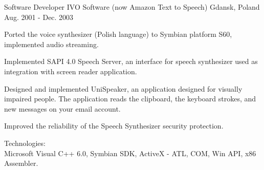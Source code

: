 \begin{cventries}
\cventry
{Software Developer} %
{IVO Software (now Amazon Text to Speech)} %
{Gdansk, Poland} %
{Aug. 2001 - Dec. 2003} %
{
  \begin{cvitems} %
    \item
    {
      Ported the voice synthesizer (Polish language) to Symbian platform S60, implemented audio streaming.
    }
    \item
    {
      Implemented SAPI 4.0 Speech Server, an interface for speech synthesizer used as integration with screen reader application.
    }
    \item
    {
      Designed and implemented UniSpeaker, an application designed for visually impaired people.
      The application reads the clipboard, the keyboard strokes, and new messages on your email account.
    }
    \item
    {
      Improved the reliability of the Speech Synthesizer security protection.
    }
    \item
    {
      Technologies:\\
      Microsoft Visual C++ 6.0, Symbian SDK, ActiveX - ATL, COM, Win API, x86 Assembler. \\
    }
  \end{cvitems}
}

\end{cventries}
